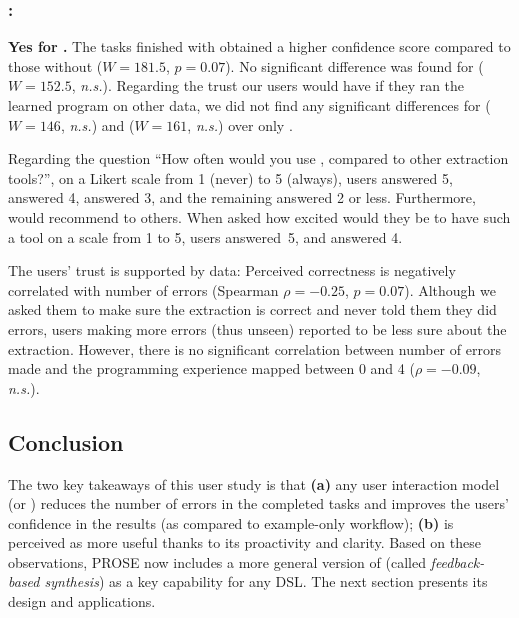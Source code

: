 \subsubsection*{\RQThreeShort: \RQThree}
\textbf{Yes for \ConversationalClarification.}
The tasks finished with \ConversationalClarification
obtained a higher confidence score compared to those without ($W=181.5$, $p = 0.07$).
No significant difference was found for \ProgramNavigation ($W=152.5$, \textit{n.s.}).
Regarding the trust our users would have if they ran the learned program on
other data, we did not find any significant differences for
\ConversationalClarification ($W=146$, \textit{n.s.}) and \ProgramNavigation ($W=161$, \textit{n.s.}) over only \BI.

Regarding the question ``How often would you use \FlashProg, compared to
other extraction tools?'', on a Likert scale from 1 (never) to 5 (always), \preferredToHaveFlashProgFive{} users
answered 5, \preferredToHaveFlashProgFour{} answered 4, \preferredToHaveFlashProgThree{} answered 3, and the remaining
\preferredToHaveFlashProgTwoOrLess{} answered 2 or less.
Furthermore,  would
recommend \FlashProg to others.
When asked how excited would they be to have such a tool on a scale from 1 to 5, \excitementPercentToHaveFlashProgFive{}
users answered~5, and \excitementPercentToHaveFlashProgFour{} answered 4.

The users' trust is supported by data: Perceived correctness is negatively correlated
with number of errors (Spearman $\rho=-0.25$, $p=0.07$).
Although we asked them to make sure the extraction is correct
and never told them they did errors, users making more errors  (thus unseen)
reported to be less sure about the extraction.
However, there is no significant correlation between number of errors made and
the programming experience mapped between 0 and 4 ($\rho=-0.09$, \textit{n.s.}).

\subsection{Conclusion}
The two key takeaways of this user study is that
\textbf{(a)} any user interaction model (\ProgramNavigation or \ConversationalClarification) reduces the number of
errors in the completed tasks and improves the users' confidence in the results (as compared to example-only workflow);
\textbf{(b)} \ConversationalClarification is perceived as more useful thanks to its proactivity and clarity.
Based on these observations, PROSE now includes a more general version of \ConversationalClarification (called
\emph{feedback-based synthesis}) as a key capability for any DSL.
The next section presents its design and applications.
